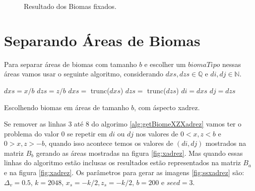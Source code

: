 \begin{figure}[H]
     \caption{Resultado dos Biomas fixados.}
     
     \label{fig:bssComBiomasFixados}
\end{figure}

\section{Separando Áreas de Biomas}
Para separar áreas de biomas com tamanho $b$ e escolher um $biomaTipo$ nessas áreas
vamos usar o seguinte algoritmo, considerando $dxs, dzs \in \mathbb{Q}$ e $di, dj \in \mathbb{N}$.

\begin{algorithm}[H]\label{alg:getBiomeXZXadrez}
    $dxs = x/b$\;
    $dzs = z/b$\;
    $dxs =$ trunc($dxs$)\;
    $dzs =$ trunc($dzs$)\;
    $di = dxs$\;
    $dj = dzs$\;
    
    
    \caption{Escolhendo biomas em áreas de tamanho $b$, com áspecto xadrez.}
\end{algorithm}

Se remover as linhas 3 até 8 do algorimo \ref{alg:getBiomeXZXadrez} vamos ter o 
problema do valor $0$ se repetir em $di$ ou $dj$ nos valores de $0 < x, z < b$ e $0 > x, z > -b$, 
quando isso acontece temos os valores de $(di, dj)$ mostrados na
matriz $B_{b}$ gerando as áreas mostradas na figura \ref{fig:xadrez}. Mas quando essas
linhas do algoritmo estão inclusas os resultados estão representados na matriz $B_{a}$
e na figura \ref{fig:xadrez}. Os parâmetros para gerar as
imagens \ref{fig:ssxadrez} são: $\Delta_{v} = 0.5$, 
$k = 2048$, $ x_{s} = -k/2 , z_{s} = -k/2$, $b = 200$ e $seed = 3$.

